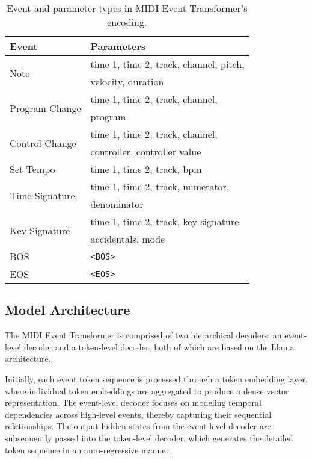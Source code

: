 \begin{table}[t]
    \centering
    \begin{tabular}{ll}
        \toprule
        Event  & Parameters \\
        \midrule
        \multirow{2}{*}{Note}           & time 1, time 2, track, channel, pitch,  \\
                                        & velocity, duration \\
        \multirow{2}{*}{Program Change} & time 1, time 2, track, channel, \\
                                        & program \\
        \multirow{2}{*}{Control Change} & time 1, time 2, track, channel,  \\
                                        & controller, controller value \\
        Set Tempo                       & time 1, time 2, track, bpm \\
        \multirow{2}{*}{Time Signature} & time 1, time 2, track, numerator,  \\
                                        & denominator \\
        \multirow{2}{*}{Key Signature}  & time 1, time 2, track, key signature \\
                                        & accidentals, mode \\
        BOS                             & \texttt{<BOS>} \\
        EOS                             & \texttt{<EOS>} \\
        \bottomrule
    \end{tabular}
    \caption{Event and parameter types in MIDI Event Transformer's encoding.}
    \label{tab:event list}
\end{table}


\subsection{Model Architecture}

The MIDI Event Transformer is comprised of two hierarchical decoders: an event-level decoder and a token-level decoder, both of which are based on the Llama architecture.

Initially, each event token sequence is processed through a token embedding layer, where individual token embeddings are aggregated to produce a dense vector representation. The event-level decoder focuses on modeling temporal dependencies across high-level events, thereby capturing their sequential relationships. The output hidden states from the event-level decoder are subsequently passed into the token-level decoder, which generates the detailed token sequence in an auto-regressive manner.

